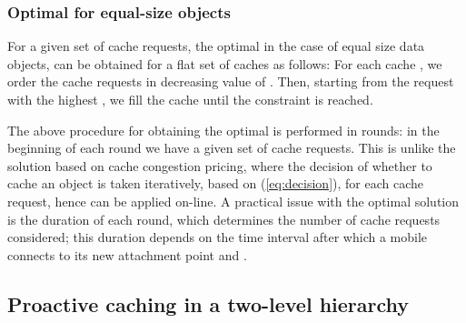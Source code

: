 \documentclass[conference]{IEEEtran}
\newcommand{\mynote}[1]{{{\medskip
\footnotesize \em \noindent Note: #1}}\medskip}
\renewcommand{\mynote}[1]{}
\begin{document}
\subsubsection{Optimal for equal-size objects}
\label{sec:opt}

\mynote{
Key points:
\begin{itemize}
\item Problem assumes some set of cache requests, and seeks to find which and where to cache objects.
\item Optimal solution is implemented in rounds.
\end{itemize}
}

For a given set of cache requests, the optimal in the case of equal size data objects, can be obtained for a flat set of caches as follows: For each cache , we order the cache requests in  decreasing value of . Then, starting from the request with the highest , we fill the cache until the constraint  is reached.

The above procedure for obtaining the optimal is performed in rounds: in the beginning of each round we have a given set of cache requests. This is unlike the solution based on cache congestion pricing, where the decision of whether to cache an object is taken iteratively, based on (\ref{eq:decision}), for each cache request, hence can be applied on-line.
A practical issue with the optimal solution is the duration of each round, which determines the number of cache requests considered; this duration depends on the time interval after which a mobile connects to its new attachment point and .

\vspace{-0.10in}
\subsection{Proactive caching in a two-level hierarchy}
\label{sec:two-level}
\vspace{-0.03in}

\mynote{
\begin{itemize}
\item  Show why problem is difficult, prove NP.
\item Separate problem to solution of two problems, which consider a single-level cache set, hence can be solved distributed as in previous subsection. Then, from the two solutions take the one that yields smallest delay.
\item Show communication of information between middle cache and leaf caches. Figure with two-levels of caches.
\item When there are two or more mid-level caches, then each mid-level cache implements same procedure described. Each leaf cache is child of one mid-level cache.
\item possibly add pseudocode algorithm to make approach explicit/clear.
\item Alternative: maintain a congestion price for mid-level cache. Decide to cache object in mid-level cache only if Delay(object fetched in mid-level cache)-Delay(object not fetched in mid-level cache)  .
    \end{itemize}
}
\end{document}
